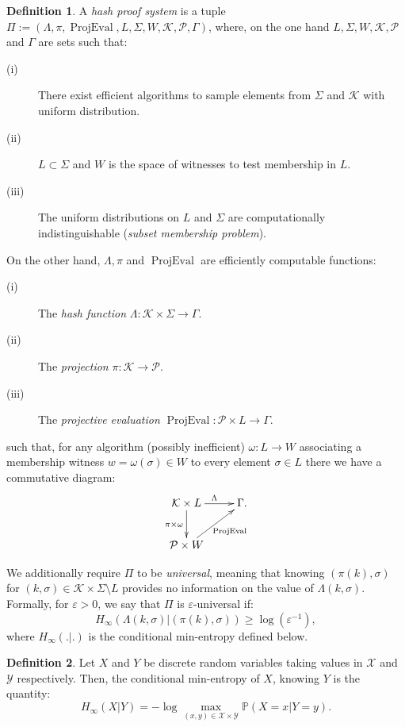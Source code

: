 \documentclass[a4paper,10pt]{report}
\theoremstyle{definition}
\newtheorem{Definition}{Definition}[chapter]
\theoremstyle{plain}
\theoremstyle{definition}
\newcommand{\m}[1]{\mathcal{#1}}
\renewcommand{\(}{\left(}
\renewcommand{\)}{\right)}
\renewcommand{\P}{\mathbb{P}}
\DeclareMathOperator{\ProjEval}{ProjEval}
\begin{document}
\begin{Definition}
A \emph{hash proof system} is a tuple $\Pi:=(\Lambda,\pi,\ProjEval,L,\Sigma,W,\m{K},\m{P},\Gamma)$, where, on the one hand $L,\Sigma,W,\m{K},\m{P}$ and $\Gamma$ are sets such that:
\begin{description}
\item[(i)] There exist efficient algorithms to sample elements from $\Sigma$ and $\m{K}$ with uniform distribution.
\item[(ii)] $L\subset \Sigma$ and $W$ is the space of witnesses to test membership in $L$.
\item[(iii)]  The uniform distributions on $L$ and $\Sigma$ are computationally indistinguishable (\emph{subset membership problem}).
\end{description}

On the other hand, $\Lambda,\pi$ and $\ProjEval$ are efficiently computable functions:
\begin{description}
\item[(i)] The \emph{hash function} $\Lambda: \m{K}\times\Sigma\longrightarrow \Gamma$.
\item[(ii)] The \emph{projection} $\pi: \m{K}\longrightarrow \m{P}$.
\item[(iii)] The \emph{projective evaluation} $\ProjEval: \m{P}\times L\longrightarrow \Gamma$.
\end{description}
such that, for any algorithm (possibly inefficient) $\omega : L\longrightarrow W$ associating a membership witness $w=\omega(\sigma)\in W$ to every element $\sigma\in L$ there we have a commutative diagram:
\[
\xymatrix{
\m{K}\times L  \ar[r]^{\Lambda} \ar[d]_{\pi\times\omega} & \Gamma.\\
\m{P}\times W \ar[ru]_{\ProjEval} &
}
\]

We additionally require $\Pi$ to be \emph{universal}, meaning that knowing $(\pi(k),\sigma)$ for $(k,\sigma)\in \m{K}\times \Sigma\setminus L$ provides no information on the value of $\Lambda(k,\sigma)$. Formally, for $\varepsilon>0$, we say that $\Pi$ is $\varepsilon$-universal if:
\[H_\infty(\Lambda(k,\sigma)|(\pi(k),\sigma))\geq\log(\varepsilon^{-1}),\]
where $H_\infty(.|.)$ is the conditional min-entropy defined below.
\end{Definition}

\begin{Definition}
Let $X$ and $Y$ be discrete random variables taking values in $\m{X}$ and $\m{Y}$ respectively. Then, the conditional min-entropy of $X$, knowing $Y$ is the quantity:
\[H_\infty(X|Y)=-\log\max_{(x,y)\in\m{X}\times\m{Y}}\P(X=x|Y=y).\]
\end{Definition}
\end{document}
